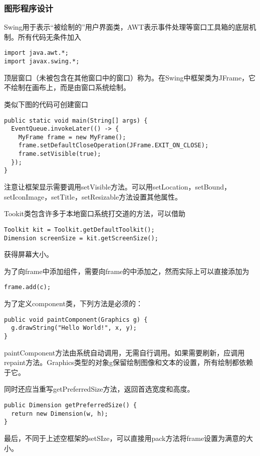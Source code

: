 \documentclass{ctexart}
\begin{document}
\subsubsection*{图形程序设计}
Swing用于表示“被绘制的”用户界面类，AWT表示事件处理等窗口工具箱的底层机制。所有代码无条件加入
\begin{lstlisting}
import java.awt.*;
import javax.swing.*;
\end{lstlisting}
\par
顶层窗口（未被包含在其他窗口中的窗口）称为。在Swing中框架类为JFrame，它不绘制在画布上，而是由窗口系统绘制。
\par
类似下图的代码可创建窗口
\begin{lstlisting}
public static void main(String[] args) {
  EventQueue.invokeLater(() -> {
    MyFrame frame = new MyFrame();
    frame.setDefaultCloseOperation(JFrame.EXIT_ON_CLOSE);
    frame.setVisible(true);
  });
}
\end{lstlisting}
\par
注意让框架显示需要调用setVisible方法。可以用setLocation，setBound，setIconImage，setTitle，setResizable方法设置其他属性。
\par
Tookit类包含许多于本地窗口系统打交道的方法，可以借助
\begin{lstlisting}
Toolkit kit = Toolkit.getDefaultToolkit();
Dimension screenSize = kit.getScreenSize();
\end{lstlisting}
获得屏幕大小。
\par
为了向frame中添加组件，需要向frame的中添加之，然而实际上可以直接添加为
\begin{lstlisting}
frame.add(c);
\end{lstlisting}
\par
为了定义component类，下列方法是必须的：
\begin{lstlisting}
public void paintComponent(Graphics g) {
  g.drawString("Hello World!", x, y);
}
\end{lstlisting}
paintComponent方法由系统自动调用，无需自行调用。如果需要刷新，应调用repaint方法。Graphics类型的对象g保留绘制图像和文本的设置，所有绘制都依赖于它。
\par
同时还应当重写getPreferredSize方法，返回首选宽度和高度。
\begin{lstlisting}
public Dimension getPreferredSize() {
  return new Dimension(w, h);
}
\end{lstlisting}
\par
最后，不同于上述空框架的setSIze，可以直接用pack方法将frame设置为满意的大小。
\par
\end{document}
